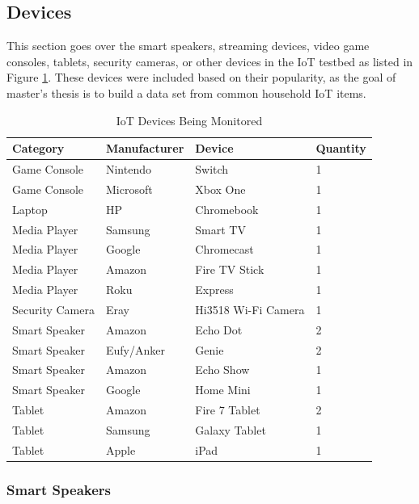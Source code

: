 \subsection{Devices}
\label{Devices}
This section goes over the smart speakers, streaming devices, video game consoles, tablets, security cameras, or other devices in the IoT testbed as listed in Figure \ref{tab:devices}. These devices were included based on their popularity, as the goal of master's thesis is to build a data set from common household IoT items.

\begin{table}[H]
    \centering
    \caption{IoT Devices Being Monitored}
    \begin{tabular}{@{}llll@{}}
    \toprule
    Category & Manufacturer & Device        & Quantity \\ \midrule
    Game Console & Nintendo     & Switch        & 1        \\
    Game Console & Microsoft    & Xbox One      & 1        \\
    Laptop & HP           & Chromebook    & 1        \\
    Media Player & Samsung      & Smart TV      & 1        \\
    Media Player & Google       & Chromecast    & 1        \\
    Media Player & Amazon       & Fire TV Stick    & 1        \\
    Media Player & Roku         & Express       & 1        \\
    Security Camera & Eray    & Hi3518 Wi-Fi Camera     & 1        \\
    Smart Speaker & Amazon       & Echo Dot      & 2        \\
    Smart Speaker & Eufy/Anker   & Genie         & 2        \\
    Smart Speaker & Amazon       & Echo Show     & 1        \\
    Smart Speaker & Google       & Home Mini     & 1        \\
    Tablet & Amazon       & Fire 7 Tablet & 2        \\
    Tablet & Samsung      & Galaxy Tablet & 1        \\
    Tablet & Apple        & iPad          & 1        \\ \bottomrule
    \end{tabular}
    \label{tab:devices}
\end{table}

\subsubsection{Smart Speakers}
\label{Smart Speakers}

